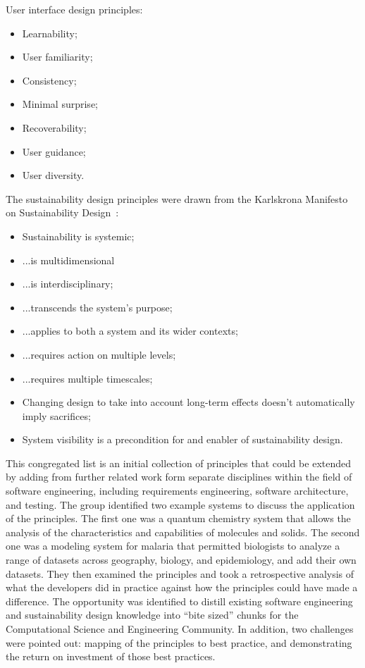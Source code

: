 User interface design principles:
\begin{itemize}
\item Learnability;
\item User familiarity;
\item Consistency;
\item Minimal surprise;
\item Recoverability;
\item User guidance;
\item User diversity.
\end{itemize}

The sustainability design principles were drawn from the Karlskrona Manifesto on Sustainability Design~\cite{Becker:2014}:
\begin{itemize}
\item Sustainability is systemic;
\item ...is multidimensional
\item ...is interdisciplinary;
\item ...transcends the system's purpose;
\item ...applies to both a system and its wider contexts;
\item ...requires action on multiple levels;
\item ...requires multiple timescales;
\item Changing design to take into account long-term effects doesn't automatically imply sacrifices;
\item System visibility is a precondition for and enabler of sustainability design.
\end{itemize}

This congregated list is an initial collection of principles that could be extended by adding from further 
related work form separate disciplines within the field of software engineering, including requirements 
engineering, software architecture, and testing. The group identified two example systems to discuss 
the application of the principles. The first one was a quantum chemistry system that allows the analysis 
of the characteristics and capabilities of molecules and solids. The second one was a modeling system 
for malaria that permitted biologists to analyze a range of datasets across geography, biology, and 
epidemiology, and add their own datasets. They then examined the principles and took a retrospective 
analysis of what the developers did in practice against how the principles could have made a 
difference. The opportunity was identified to distill existing software engineering and sustainability 
design knowledge into ``bite sized'' chunks for the Computational Science and Engineering 
Community. In addition, two challenges were pointed out: mapping of the principles to best practice, 
and  demonstrating the return on investment of those best practices.

